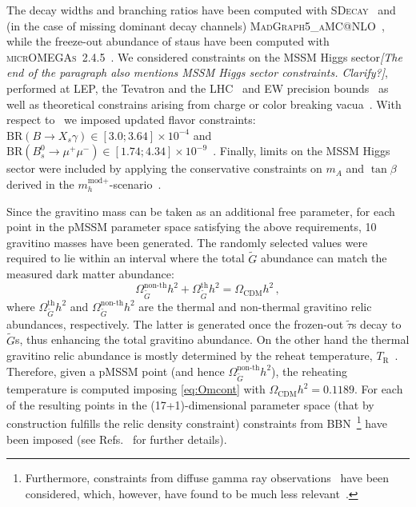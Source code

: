 \documentclass[preprint,number,sort&compress,twocolumn,3p]{elsstyarticle}
\newcommand{\s}[1]{\widetilde{#1}}
\newcommand{\com}[1]{\emph{\color{red}[#1]}}  %
\begin{document}
The decay widths and branching ratios have been computed with 
\textsc{SDecay}~\cite{Djouadi:2006bz,Kraml:2007sx} and (in the case of missing dominant decay channels) \textsc{MadGraph5\_aMC@NLO}~\cite{Alwall:2014hca}, while
the freeze-out abundance of staus have been computed with \textsc{micrOMEGAs}~2.4.5~\cite{Belanger:2008sj}.
We considered constraints on the MSSM Higgs sector\com{The end of the paragraph also mentions MSSM Higgs sector constraints. Clarify?}, performed at LEP, the Tevatron and the LHC~\cite{Bechtle:2011sb}
and EW precision bounds~\cite{Group:2012gb,Bechtle:2012jw,Heinemeyer:2006px} as well as
theoretical constrains arising from charge or color breaking vacua~\cite{Kitahara:2013lfa,Frere:1983ag,AlvarezGaume:1983gj,Claudson:1983et,Kounnas:1983td,Derendinger:1983bz}. With respect to~\cite{Heisig:2013rya} we imposed updated flavor constraints: $\text{BR}(B\to X_s\gamma) \in [3.0;3.64]\times 10^{-4}$ 
\cite{Amhis:2016xyh} and 
$\text{BR}(B_s^0\to\mu^+\mu^-) \in [1.74;4.34] \times 10^{-9}$~\cite{Aaij:2017vad}.
Finally, limits on the MSSM Higgs sector were included by applying the conservative constraints on $m_A$ and $\tan\beta$
derived in the $m_h^{\text{mod}+}$-scenario~\cite{Sirunyan:2018zut}. 

Since the gravitino mass can be taken as an additional free parameter, for each point in the pMSSM parameter space satisfying the above requirements, 10 gravitino masses have been generated. The randomly selected values were required to lie within an interval where the total $\tilde G$ abundance can match the measured dark matter abundance: 
\begin{equation}
\label{eq:Omcont}
\Omega_{\s G}^{\text{non-th}} h^2+\Omega^{\text{th}}_{\s G}h^2  = \Omega_\text{CDM}h^2\,,
\end{equation}
where $\Omega^{\text{th}}_{\s G}h^2$ and $\Omega_{\s G}^{\text{non-th}} h^2$ are the thermal and non-thermal gravitino relic abundances, respectively.
The latter is generated once the frozen-out $\tilde{\tau}$s decay to $\tilde G$s,
thus enhancing the total gravitino abundance.
On the other hand the thermal gravitino relic abundance is mostly determined by the reheat temperature, $T_\text{R}$~\cite{Bolz:1998ek,Bolz:2000fu,Pradler:2006hh}.
Therefore, given a pMSSM point (and hence $\Omega_{\s G}^{\text{non-th}} h^2$), the reheating temperature is computed imposing \eqref{eq:Omcont} with $\Omega_\text{CDM}h^2=0.1189$. %
For each of the resulting points in the (17+1)-dimensional parameter space (that by construction fulfills the
relic density constraint) constraints from BBN~\cite{Jedamzik:2007qk,Jedamzik:2006xz}\footnote{Furthermore, constraints from diffuse gamma ray
observations~\cite{Sreekumar:1997yg,Kribs:1996ac} have been considered, which, however, have found to be much less relevant~\cite{Heisig:2013sva}.}
have been imposed (see Refs.~\cite{Heisig:2013rya,Heisig:2013sva} for further details).
\end{document}
